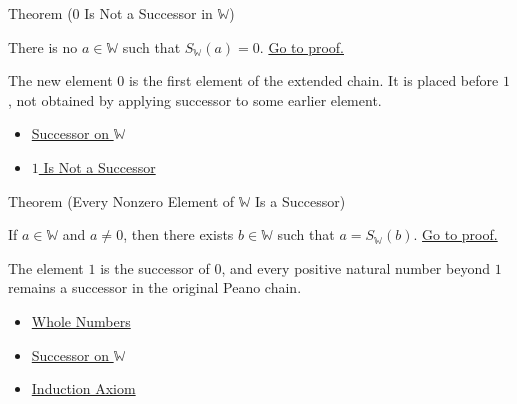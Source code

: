 \begin{theorembox}{Theorem (\texorpdfstring{$0$}{0} Is Not a Successor in \texorpdfstring{$\mathbb{W}$}{W})}
\begin{theorem}
\label{thm:zero-is-not-successor-in-w}
There is no $a\in\mathbb{W}$ such that $S_{\mathbb{W}}(a)=0$.
\hyperref[prf:zero-is-not-successor-in-w]{Go to proof.}
\end{theorem}
\end{theorembox}

\begin{remark*}[Interpretation]
The new element $0$ is the first element of the extended chain. It is placed
before $1$, not obtained by applying successor to some earlier element.
\end{remark*}

\begin{dependencies}
\begin{itemize}
  \item \hyperref[def:successor-on-w]{Successor on $\mathbb{W}$}
  \item \hyperref[ax:peano-one-not-successor]{$1$ Is Not a Successor}
\end{itemize}
\end{dependencies}

\begin{theorembox}{Theorem (Every Nonzero Element of \texorpdfstring{$\mathbb{W}$}{W} Is a Successor)}
\begin{theorem}
\label{thm:every-nonzero-w-is-successor}
If $a\in\mathbb{W}$ and $a\neq 0$, then there exists
$b\in\mathbb{W}$ such that $a=S_{\mathbb{W}}(b)$.
\hyperref[prf:every-nonzero-w-is-successor]{Go to proof.}
\end{theorem}
\end{theorembox}

\begin{remark*}[Interpretation]
The element $1$ is the successor of $0$, and every positive natural number
beyond $1$ remains a successor in the original Peano chain.
\end{remark*}

\begin{dependencies}
\begin{itemize}
  \item \hyperref[def:whole-numbers]{Whole Numbers}
  \item \hyperref[def:successor-on-w]{Successor on $\mathbb{W}$}
  \item \hyperref[ax:peano-induction]{Induction Axiom}
\end{itemize}
\end{dependencies}

